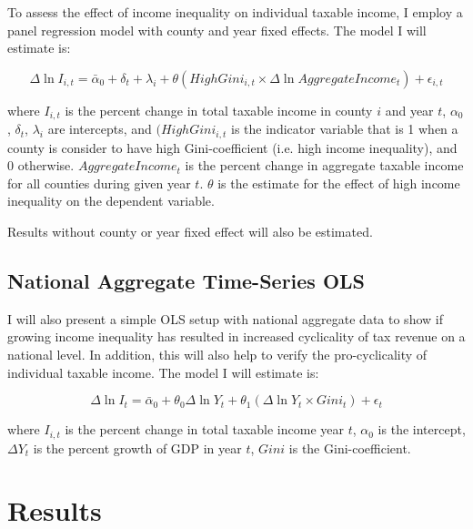 \documentclass{article}
\begin{document}
To assess the effect of income inequality on individual taxable income, I employ a panel regression model with county and year fixed effects. The model I will estimate is:

$$ \Delta \ln I_{i, t} = \bar \alpha_0 + \delta_t + \lambda_i + \theta (HighGini_{i, t} \times \Delta \ln AggregateIncome_t) + \epsilon_{i, t}$$

\begin{flushleft}
where $I_{i, t}$ is the percent change in total taxable income in county $i$ and year $t$, $\alpha_0$, $\delta_t$,  $\lambda_i$ are intercepts, and $(HighGini_{i, t}$ is the indicator variable that is 1 when a county is consider to have high Gini-coefficient (i.e. high income inequality), and 0 otherwise. $AggregateIncome_t$ is the percent change in aggregate taxable income for all counties during given year $t$. $\theta$ is the estimate for the effect of high income inequality on the dependent variable. 
\end{flushleft}

Results without county or year fixed effect will also be estimated. 

\subsection{National Aggregate Time-Series OLS}

I will also present a simple OLS setup with national aggregate data to show if growing income inequality has resulted in increased cyclicality of tax revenue on a national level. In addition, this will also help to verify the pro-cyclicality of individual taxable income. The model I will estimate is:

$$ \Delta \ln I_t = \bar \alpha_0 + \theta_0 \Delta \ln Y_t + \theta_1 (\Delta \ln Y_t \times Gini_t) + \epsilon_{t}$$

\begin{flushleft}
where $I_{i, t}$ is the percent change in total taxable income year $t$, $\alpha_0$ is the intercept, $\Delta Y_t$ is the percent growth of GDP in year $t$, $Gini$ is the Gini-coefficient. 
\end{flushleft}










\pagebreak
\section{Results}
\end{document}
